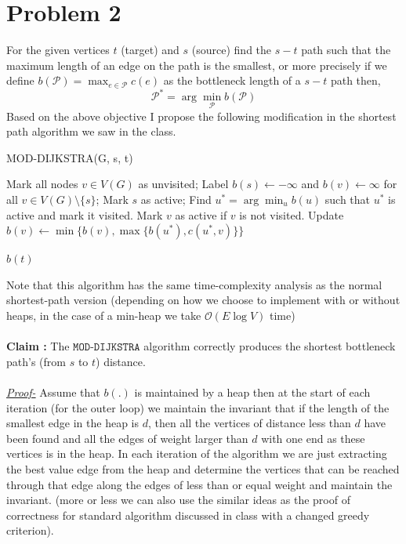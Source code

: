 \documentclass{article}
\newcommand{\bigOh}[1]{\mathcal{O}(#1)}
\begin{document}
    \section{Problem 2}
    For the given vertices $t$ (target) and $s$ (source) find the $s-t$ path such that the maximum length of an edge on the path is the smallest, or more precisely if we define $b(\mathcal{P}) = \max_{e\in \mathcal{P}} c(e)$ as the bottleneck length of a $s-t$ path then, 
    \begin{equation*}
        \mathcal{P}^* = \arg\min_{\mathcal{P}} b(\mathcal{P})
    \end{equation*}
    Based on the above objective I propose the following modification in the shortest path algorithm we saw in the class. 
    \begin{algorithm}[H]
        \caption{MOD-DIJKSTRA(G, s, t)}
        \begin{algorithmic}[1]
            \State Mark all nodes $v\in V(G)$ as unvisited; 
            \State Label $b(s)\leftarrow -\infty$ and $b(v) \leftarrow \infty$ for all $v \in V(G)\setminus \{s\}$; 
            \State Mark $s$ as active; 
                \State Find $u^* = \arg \min_u b(u)$ such that $u^*$ is active and mark it visited. 
                    \State Mark $v$ as active if $v$ is not visited. 
                    \State Update $b(v) \leftarrow \min\{b(v), \max\{b(u^*), c(u^*, v)\}\}$
                \EndFor

            \EndWhile
            \Statex 
            \State \Return $b(t)$
        \end{algorithmic}
    \end{algorithm}
    \noindent Note that this algorithm has the same time-complexity analysis as the normal shortest-path version (depending on how we choose to implement with or without heaps, in the case of a min-heap we take $\bigOh{E\log V}$ time)\\\\
    \textbf{Claim :} The $\texttt{MOD-DIJKSTRA}$ algorithm correctly produces the shortest bottleneck path's (from $s$ to $t$) distance. \\\\
    \textit{\underline{Proof-}} Assume that $b(.)$ is maintained by a heap then at the start of each iteration (for the outer loop) we maintain the invariant that if the length of the smallest edge in the heap is $d$, then all the vertices of distance less than $d$ have been found and all the edges of weight larger than $d$ with one end as these vertices is in the heap. In each iteration of the algorithm we are just extracting the best value edge from the heap and determine the vertices that can be reached through that edge along the edges of less than or equal weight and maintain the invariant. (more or less we can also use the similar ideas as the proof of correctness for standard algorithm discussed in class with a changed greedy criterion). 
    \newpage
\end{document}
